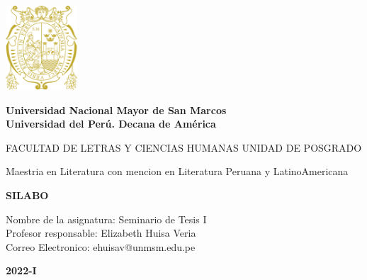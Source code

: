 \documentclass[a4paper]{article}
\begin{document}
\begin{titlepage}
\begin{center}
\includegraphics[width=0.2\textwidth]{logo UNMSM.png}
\end{center}
\begin{center}
{\huge \bf Universidad Nacional Mayor de San Marcos}\\[0.3cm]
{\large \bf Universidad del Perú. Decana de América}\\[0.5cm]
\end{center}
\vspace{0.5cm}
\begin{center}
\large{FACULTAD DE LETRAS Y CIENCIAS HUMANAS}
\large{UNIDAD DE POSGRADO}
\end{center}
\vspace{0.5cm}
\begin{center}
{\large Maestria en Literatura con mencion en Literatura Peruana y LatinoAmericana}\\[0.3cm]
\end{center}
\vspace{0.10cm}
\begin{center}
{\huge \bf SILABO}\\[0.3cm]
\end{center}
\vspace{2cm}
\begin{flushleft}
Nombre de la asignatura: Seminario de Tesis I \\ 
Profesor responsable: Elizabeth Huisa Veria \\ 
Correo Electronico: ehuisav@unmsm.edu.pe \\ 
\end{flushleft}
\vspace{2cm}
\begin{center}
{\huge \bf 2022-I}\\[0.3cm]
\end{center}
\end{titlepage}
\newpage
\end{document}
